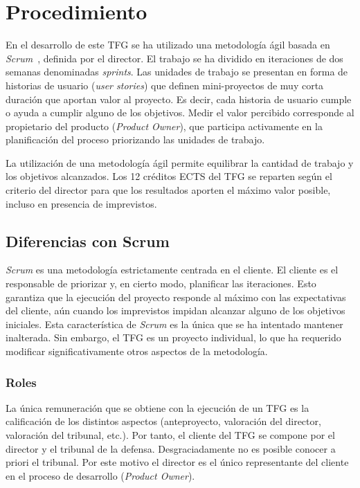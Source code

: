 \chapter{Procedimiento}
\label{ch:procedimiento}

En el desarrollo de este TFG se ha utilizado una metodología ágil basada en \emph{Scrum}~\cite{scrumguide}, definida por el director.  El trabajo se ha dividido en iteraciones de dos semanas denominadas \emph{sprints}.  Las unidades de trabajo se presentan en forma de historias de usuario (\emph{user stories}) que definen mini-proyectos de muy corta duración que aportan valor al proyecto.  Es decir, cada historia de usuario cumple o ayuda a cumplir alguno de los objetivos.  Medir el valor percibido corresponde al propietario del producto (\emph{Product Owner}), que participa activamente en la planificación del proceso priorizando las unidades de trabajo.

La utilización de una metodología ágil permite equilibrar la cantidad de trabajo y los objetivos alcanzados.  Los 12 créditos ECTS del TFG se reparten según el criterio del director para que los resultados aporten el máximo valor posible, incluso en presencia de imprevistos.

\section{Diferencias con Scrum}

\emph{Scrum} es una metodología estrictamente centrada en el cliente.  El cliente es el responsable de priorizar y, en cierto modo, planificar las iteraciones.  Esto garantiza que la ejecución del proyecto responde al máximo con las expectativas del cliente, aún cuando los imprevistos impidan alcanzar alguno de los objetivos iniciales.  Esta característica de \emph{Scrum} es la única que se ha intentado mantener inalterada.  Sin embargo, el TFG es un proyecto individual, lo que ha requerido modificar significativamente otros aspectos de la metodología.

\subsection{Roles}

La única remuneración que se obtiene con la ejecución de un TFG es la calificación de los distintos aspectos (anteproyecto, valoración del director, valoración del tribunal, etc.).  Por tanto, el cliente del TFG se compone por el director y el tribunal de la defensa.  Desgraciadamente no es posible conocer a priori el tribunal.  Por este motivo el director es el único representante del cliente en el proceso de desarrollo (\emph{Product Owner}).

